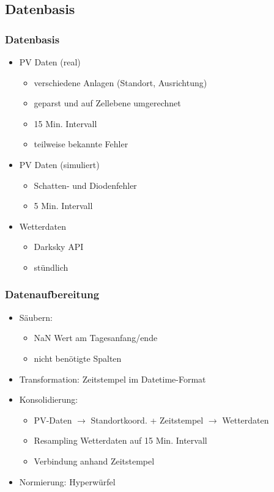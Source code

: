 \documentclass[utf8x, xcolor=dvipsnames]{beamer}
\begin{document}
\subsection{Datenbasis}

\begin{frame}
\frametitle{Datenbasis}
\begin{itemize}
	\item PV Daten (real)
	\begin{itemize}
		\item verschiedene Anlagen (Standort, Ausrichtung)
		\item geparst und auf Zellebene umgerechnet
		\item 15 Min. Intervall
		\item teilweise bekannte Fehler\newline
	\end{itemize}
	\item PV Daten (simuliert)
	\begin{itemize}
		\item Schatten- und Diodenfehler
		\item 5 Min. Intervall\newline
	\end{itemize}
	\item Wetterdaten
	\begin{itemize}
		\item Darksky API
		\item stündlich
	\end{itemize}
\end{itemize}
\end{frame}

\begin{frame}
\frametitle{Datenaufbereitung}
\begin{itemize}
	\item Säubern:
	\begin{itemize}
		\item NaN Wert am Tagesanfang/ende
		\item nicht benötigte Spalten\newline
	\end{itemize}
	\item Transformation: Zeitstempel im Datetime-Format\newline
	\item Konsolidierung:
	\begin{itemize}
		\item PV-Daten $\rightarrow$ Standortkoord. + Zeitstempel $\rightarrow$ Wetterdaten
		\item Resampling Wetterdaten auf 15 Min. Intervall
		\item Verbindung anhand Zeitstempel\newline
	\end{itemize}
	\item Normierung: Hyperwürfel

\end{itemize}
\end{frame}
\end{document}
